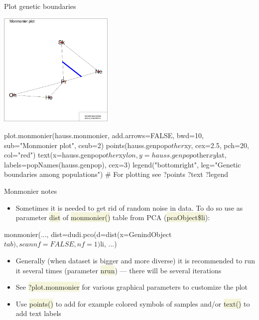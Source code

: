 \documentclass[compress, ucs, xelatex, 11pt, xcolor=svgnames, aspectratio=169,
	hyperref={
		bookmarks=true,
		unicode=true,
		colorlinks=true,
		pdftitle={Molecular data in R},
		plainpages=false,
		pdfauthor={Vojtech Zeisek},
		pdfsubject={Course about phylogeny and evolution in R},
		pdfcreator={XeLaTeX},
		pdfkeywords={R, evolution, phylogeny, molecular data},
		linkcolor=Crimson, %
		anchorcolor=Magenta, %
		citecolor=Magenta, %
		filecolor=Magenta, %
		menucolor=Magenta, %
		urlcolor=DodgerBlue, %
		pdftex},
	url={hyphens, lowtilde} %
	]{beamer}
\renewcommand{\texttt}[1]{\colorbox{Beige}{{\ttfamily #1}}}
\begin{document}
\begin{frame}[fragile]{Plot genetic boundaries}
	\begin{multicols}{2}
		\includegraphics[height=5.5cm]{monmonier.png}
		\begin{spluscode}
    plot.monmonier(hauss.monmonier,
      add.arrows=FALSE, bwd=10,
      sub="Monmonier plot", csub=2)
    points(hauss.genpop$other$xy,
      cex=2.5, pch=20, col="red")
    text(x=hauss.genpop$other$xy$lon,
      y=hauss.genpop$other$xy$lat,
      labels=popNames(hauss.genpop),
      cex=3)
    legend("bottomright",
      leg="Genetic boundaries\n
      among populations")
    # For plotting see
    ?points
    ?text
    ?legend
		\end{spluscode}
	\end{multicols}
\end{frame}

\begin{frame}[fragile]{Monmonier notes}
	\begin{itemize}
		\item Sometimes it is needed to get rid of random noise in data. To do so use as parameter \texttt{dist} of \texttt{monmonier()} table from PCA (\texttt{pcaObject\$li}):
	\end{itemize}
	\begin{spluscode}
    monmonier(..., dist=dudi.pco(d=dist(x=GenindObject$tab),
      scannf=FALSE, nf=1)$li, ...)
	\end{spluscode}
	\begin{itemize}
		\item Generally (when dataset is bigger and more diverse) it is recommended to run it several times (parameter \texttt{nrun}) --- there will be several iterations
		\item See \texttt{?plot.monmonier} for various graphical parameters to customize the plot
		\item Use \texttt{points()} to add for example colored symbols of samples and/or \texttt{text()} to add text labels
	\end{itemize}
\end{frame}
\end{document}
